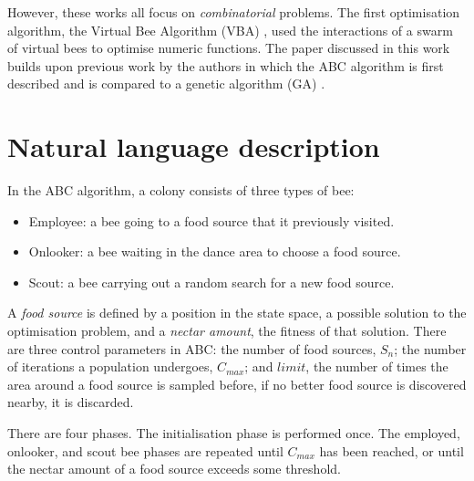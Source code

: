 \documentclass{article}
\begin{document}
However, these works all focus on \textit{combinatorial} problems. The first optimisation algorithm, the Virtual Bee Algorithm (VBA) \cite{Y05}, used the interactions of a swarm of virtual bees to optimise numeric functions. The paper discussed in this work builds upon previous work by the authors in which the ABC algorithm is first described \cite{K05} and is compared to a genetic algorithm (GA) \cite{K06}.

\section{Natural language description}

In the ABC algorithm, a colony consists of three types of bee:

\begin{itemize}

	\item{Employee: a bee going to a food source that it previously visited.}
	\item{Onlooker: a bee waiting in the dance area to choose a food source.}
	\item{Scout: a bee carrying out a random search for a new food source.}

\end{itemize}

A \textit{food source} is defined by a position in the state space, a possible solution to the optimisation problem, and a \textit{nectar amount}, the fitness of that solution. There are three control parameters in ABC: the number of food sources, $S_n$; the number of iterations a population undergoes, $C_{max}$; and $limit$, the number of times the area around a food source is sampled before, if no better food source is discovered nearby, it is discarded.

There are four phases. The initialisation phase is performed once. The employed, onlooker, and scout bee phases are repeated until $C_{max}$ has been reached, or until the nectar amount of a food source exceeds some threshold.
\end{document}
